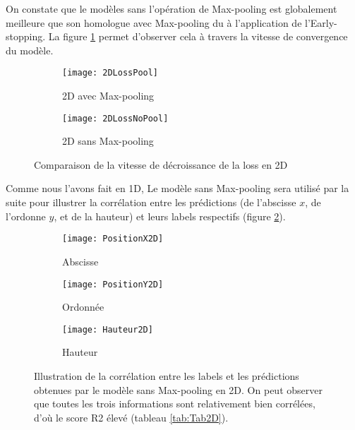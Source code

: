     On constate que le modèles sans l'opération de Max-pooling est globalement meilleure que son homologue avec Max-pooling du à l'application de l'Early-stopping. La figure \ref{fig:2DLoss} permet d'observer cela à travers la vitesse de convergence du modèle.
    
    \begin{figure}[!h]
    \begin{subfigure}{.5\textwidth}
    \centering
    \texttt{[image: 2DLossPool]}  
    \caption[2DPool]{2D avec Max-pooling}
    \end{subfigure}
    \begin{subfigure}{.5\textwidth}
    \centering
    \texttt{[image: 2DLossNoPool]}  
    \caption[2DNoPool]{2D sans Max-pooling}
    \end{subfigure}

    \centering
    \decoRule
    \caption[Loss en 2D]{Comparaison de la vitesse de décroissance de la loss en 2D}
    \label{fig:2DLoss}
    \end{figure}

    Comme nous l'avons fait en 1D, Le modèle sans Max-pooling sera utilisé par la suite pour illustrer la corrélation entre les prédictions (de l'abscisse $x$, de l'ordonne $y$, et de la hauteur) et leurs labels respectifs (figure \ref{fig:Illustration2D}).
    \begin{figure}[!h]
    \begin{subfigure}{.33\textwidth}
    \centering
    \texttt{[image: PositionX2D]}  
    \caption[PosX2D]{Abscisse}
    \end{subfigure}
    \begin{subfigure}{.33\textwidth}
    \centering
    \texttt{[image: PositionY2D]}  
    \caption[PosY2D]{Ordonnée}
    \end{subfigure}
    \begin{subfigure}{.33\textwidth}
    \centering
    \texttt{[image: Hauteur2D]}  
    \caption[H2D]{Hauteur}
    \end{subfigure}
    
     \centering
    \decoRule
    \caption[Illustration 2D]{Illustration de la corrélation entre les labels et les prédictions obtenues par le modèle sans Max-pooling en 2D. On peut observer que toutes les trois informations sont relativement bien corrélées, d'où le score R2 élevé (tableau \ref{tab:Tab2D}).}
    \label{fig:Illustration2D}
    \end{figure}
    
